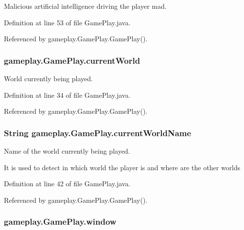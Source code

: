 Malicious artificial intelligence driving the player mad. 



Definition at line 53 of file Game\-Play.\-java.



Referenced by gameplay.\-Game\-Play.\-Game\-Play().

\hypertarget{a00010_acac96730473a405274e9ff0a58e4d77e}{
\subsubsection[{current\-World}]{ gameplay.\-Game\-Play.\-current\-World\hspace{0.3cm}{\ttfamily [protected]}}}\label{a00010_acac96730473a405274e9ff0a58e4d77e}


World currently being played. 



Definition at line 34 of file Game\-Play.\-java.



Referenced by gameplay.\-Game\-Play.\-Game\-Play().

\hypertarget{a00010_adcc37bdd0470d8adc27fa249d93adcff}{
\subsubsection[{current\-World\-Name}]{\setlength{\rightskip}{0pt plus 5cm}String gameplay.\-Game\-Play.\-current\-World\-Name\hspace{0.3cm}{\ttfamily [protected]}}}\label{a00010_adcc37bdd0470d8adc27fa249d93adcff}


Name of the world currently being played. 

It is used to detect in which world the player is and where are the other worlds 

Definition at line 42 of file Game\-Play.\-java.



Referenced by gameplay.\-Game\-Play.\-Game\-Play().

\hypertarget{a00010_aed3cc7a8f5e4838bb0b37d4014c6133e}{
\subsubsection[{window}]{ gameplay.\-Game\-Play.\-window\hspace{0.3cm}{\ttfamily [protected]}}}\label{a00010_aed3cc7a8f5e4838bb0b37d4014c6133e}


